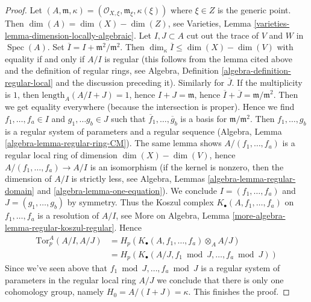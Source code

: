 \documentclass[10pt,a4paper]{amsart}
\theoremstyle{plain}
\theoremstyle{definition}
\theoremstyle{remark}
\numberwithin{equation}{subsection}
\def\Spec{\mathop{\mathrm{Spec}}}
\begin{document}
\begin{proof}
Let $(A, \mathfrak m, \kappa) =
(\mathcal{O}_{X, \xi}, \mathfrak m_\xi, \kappa(\xi))$ where $\xi \in Z$
is the generic point. Then $\dim(A) = \dim(X) - \dim(Z)$, see
Varieties, Lemma \ref{varieties-lemma-dimension-locally-algebraic}.
Let $I, J \subset A$ cut out the trace of $V$ and $W$
in $\Spec(A)$. Set $\overline{I} = I + \mathfrak m^2/\mathfrak m^2$.
Then $\dim_\kappa \overline{I} \leq \dim(X) - \dim(V)$ with equality
if and only if $A/I$ is regular (this follows from the lemma cited
above and the definition of regular rings, see
Algebra, Definition \ref{algebra-definition-regular-local}
and the discussion preceding it). Similarly for $\overline{J}$.
If the multiplicity is $1$, then
$\text{length}_A(A/I + J) = 1$, hence $I + J = \mathfrak m$, hence
$\overline{I} + \overline{J} = \mathfrak m/\mathfrak m^2$.
Then we get equality everywhere (because the intersection is
proper). Hence we find $f_1, \ldots, f_a \in I$ and $g_1, \ldots g_b \in J$
such that $\overline{f}_1, \ldots, \overline{g}_b$ is a basis
for $\mathfrak m/\mathfrak m^2$. Then $f_1, \ldots, g_b$ is a
regular system of parameters and a regular sequence
(Algebra, Lemma \ref{algebra-lemma-regular-ring-CM}).
The same lemma shows $A/(f_1, \ldots, f_a)$ is a regular local ring
of dimension $\dim(X) - \dim(V)$, hence $A/(f_1, \ldots, f_a) \to A/I$
is an isomorphism (if the kernel is nonzero, then the dimension
of $A/I$ is strictly less, see
Algebra, Lemmas \ref{algebra-lemma-regular-domain} and
\ref{algebra-lemma-one-equation}).
We conclude $I = (f_1, \ldots, f_a)$ and $J = (g_1, \ldots, g_b)$
by symmetry. Thus the Koszul complex $K_\bullet(A, f_1, \ldots, f_a)$
on $f_1, \ldots, f_a$ is a resolution of $A/I$, see
More on Algebra, Lemma \ref{more-algebra-lemma-regular-koszul-regular}.
Hence
\begin{align*}
\text{Tor}_p^A(A/I, A/J)
& =
H_p(K_\bullet(A, f_1, \ldots, f_a) \otimes_A A/J) \\
& =
H_p(K_\bullet(A/J, f_1 \bmod J, \ldots, f_a \bmod J))
\end{align*}
Since we've seen above that $f_1 \bmod J, \ldots, f_a \bmod J$ is
a regular system of parameters in the regular local ring $A/J$
we conclude that there is only one cohomology group, namely
$H_0 = A/(I + J) = \kappa$. This finishes the proof.
\end{proof}
\end{document}
